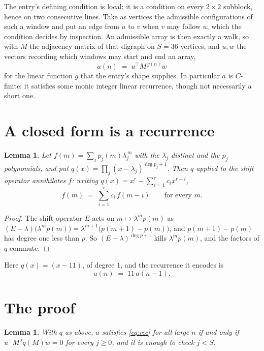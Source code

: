 \documentclass[11pt,a4paper]{article}
\theoremstyle{plain}
\newtheorem{lemma}[theorem]{Lemma}
\theoremstyle{definition}
\begin{document}
The entry's defining condition is local: it is a condition on every $2\times2$ subblock, hence on two consecutive lines. Take as vertices the
admissible configurations of such a window and put an edge from $u$ to $v$ when $v$ may
follow $u$, which the condition decides by inspection. An admissible array is then exactly a
walk, so with $M$ the adjacency matrix of that digraph on $S=36$ vertices, and $u,w$ the
vectors recording which windows may start and end an array,
\[
a(n)\;=\;u^{\!\top}M^{\,g(n)}w
\]
for the linear function $g$ that the entry's shape supplies. In particular $a$ is
$C$-finite: it satisfies some monic integer linear recurrence, though not necessarily a short
one.

\section{A closed form is a recurrence}

\begin{lemma}\label{lem:ann}
Let $f(m)=\sum_{j}p_j(m)\lambda_j^{\,m}$ with the $\lambda_j$ distinct and the $p_j$
polynomials, and put $q(x)=\prod_j(x-\lambda_j)^{\deg p_j+1}$. Then $q$ applied to the shift
operator annihilates $f$: writing $q(x)=x^{r}-\sum_{i=1}^{r}c_ix^{r-i}$,
\[
f(m)\;=\;\sum_{i=1}^{r}c_i\,f(m-i)\qquad\text{for every }m.
\]
\end{lemma}

\begin{proof}
The shift operator $E$ acts on $m\mapsto\lambda^{m}p(m)$ as
$(E-\lambda)\bigl(\lambda^{m}p(m)\bigr)=\lambda^{m+1}\bigl(p(m+1)-p(m)\bigr)$, and
$p(m+1)-p(m)$ has degree one less than $p$. So $(E-\lambda)^{\deg p+1}$ kills
$\lambda^{m}p(m)$, and the factors of $q$ commute.
\end{proof}

Here $q(x)=(x-11)$, of degree $1$, and the recurrence it encodes is
\begin{equation}\label{eq:rec}
a(n)\;=\;11\,a(n-1).
\end{equation}

\section{The proof}

\begin{lemma}\label{lem:crit}
With $q$ as above, $a$ satisfies \eqref{eq:rec} for all large $n$ if and only if
$u^{\!\top}M^{\,j}q(M)w=0$ for every $j\ge0$, and it is enough to check $j<S$.
\end{lemma}
\end{document}
